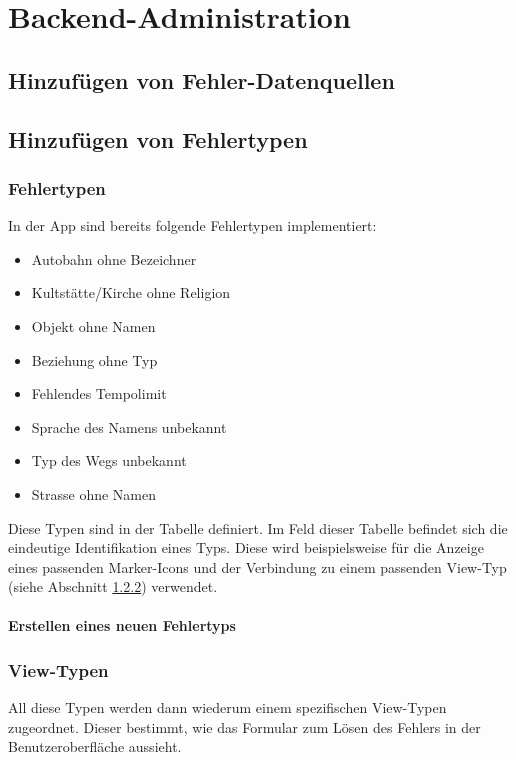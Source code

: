 \chapter{Backend-Administration}
\label{backend_administration}

\section{Hinzufügen von Fehler-Datenquellen}

\section{Hinzufügen von Fehlertypen}

\subsection{Fehlertypen}
In der App sind bereits folgende Fehlertypen implementiert:

\begin{itemize}
\item Autobahn ohne Bezeichner
\item Kultstätte/Kirche ohne Religion
\item Objekt ohne Namen
\item Beziehung ohne Typ
\item Fehlendes Tempolimit
\item Sprache des Namens unbekannt
\item Typ des Wegs unbekannt
\item Strasse ohne Namen
\end{itemize}

Diese Typen sind in der Tabelle  definiert.
Im Feld  dieser Tabelle befindet sich die eindeutige Identifikation eines Typs.
Diese wird beispielsweise für die Anzeige eines passenden Marker-Icons und der Verbindung zu einem passenden View-Typ (siehe Abschnitt \ref{view_types}) verwendet.


\subsubsection{Erstellen eines neuen Fehlertyps}


\subsection{View-Typen}
\label{view_types}
All diese Typen werden dann wiederum einem spezifischen View-Typen zugeordnet.
Dieser bestimmt, wie das Formular zum Lösen des Fehlers in der Benutzeroberfläche aussieht.

